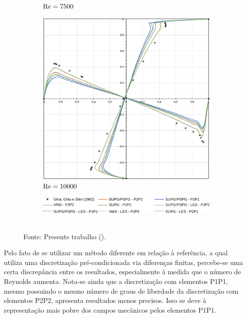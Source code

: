 \begin{figure}[h!]
\begin{subfigure}{0.4\textwidth}
        \caption{$\mathrm{Re}=7500$}
    \end{subfigure}
    \begin{subfigure}{0.4\textwidth}
        \includegraphics[width=\linewidth]{Figuras/Cavity/Re10000.pdf}
        \caption{$\mathrm{Re}=10000$}
    \end{subfigure}
    \begin{subfigure}{\textwidth}
        \centering
        \includegraphics[width=.7\linewidth]{Figuras/Cavity/legenda.pdf}
    \end{subfigure}
    \\Fonte: Presente trabalho (\the\year).
    \label{fig:cavity-results}
\end{figure}

Pelo fato de se utilizar um método diferente em relação à referência, a qual utiliza uma discretização pré-condicionada via diferenças finitas, percebe-se uma certa discrepância entre os resultados, especialmente à medida que o número de Reynolds aumenta. Nota-se ainda que a discretização com elementos P1P1, mesmo possuindo o mesmo número de graus de liberdade da discretização com elementos P2P2, apresenta resultados menos precisos. Isso se deve à representação mais pobre dos campos mecânicos pelos elementos P1P1.

